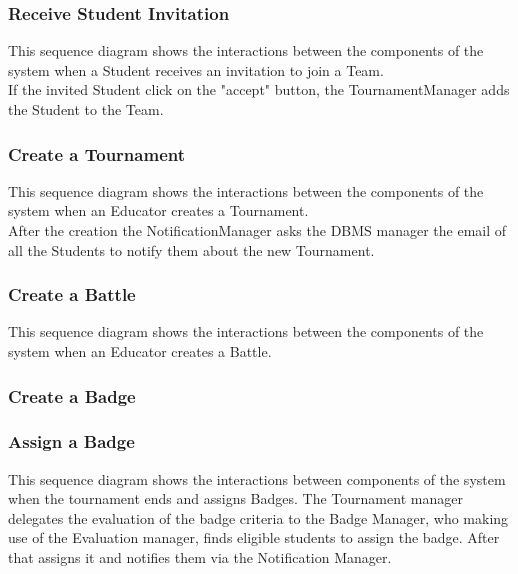 \begin{landscape}
\clearpage
\subsubsection{Receive Student Invitation} \label{sq:8}
This sequence diagram shows the interactions between the components of the system when a Student receives an invitation to join a Team.\\
If the invited Student click on the "accept" button, the TournamentManager adds the Student to the Team.\\

\clearpage
\subsubsection{Create a Tournament} \label{sq:9}
This sequence diagram shows the interactions between the components of the system when an Educator creates a Tournament.\\
After the creation the NotificationManager asks the DBMS manager the email of all the Students to notify them about the new Tournament.\\

\clearpage
\subsubsection{Create a Battle}     \label{sq:10}
This sequence diagram shows the interactions between the components of the system when an Educator creates a Battle.\\

\clearpage
\subsubsection{Create a Badge}    \label{sq:11}

\clearpage
\subsubsection{Assign a Badge}   \label{sq:12}
This sequence diagram shows the interactions between components of the system when the tournament ends and assigns Badges.
The Tournament manager delegates the evaluation of the badge criteria to the Badge Manager, who making use of the Evaluation manager, finds eligible students to assign the badge.
After that assigns it and notifies them via the Notification Manager.


\end{landscape}
